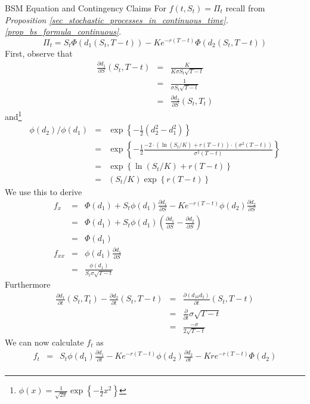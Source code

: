 \documentclass[11pt,a4paper]{article}
\begin{document}
  \begin{example}{BSM Equation and Contingency Claims}\label{ex_bsm_equation_and_contingency_claims}
    For $f(t,S_t)=\Pi_t$ recall from \textit{Proposition \ref{sec_stochastic_processes_in_continuous_time}.\ref{prop_bs_formula_continuous}}.
    \[ \Pi_t=S_t\Phi\left(d_1(S_t,T-t)\right)-Ke^{-r(T-t)}\Phi\left(d_2(S_t,T-t)\right) \]
    First, observe that
    \[\begin{array}{rcl}
      \frac{\partial d_1}{\partial S}(S_t,T-t)&=&\frac{K}{K\sigma S_t\sqrt{T-t}}\\
      &=&\frac1{\sigma S_t\sqrt{T-t}}\\
      &=&\frac{\partial d_2}{\partial S}(S_t,T_t)
    \end{array}\]
    and\footnote{$\phi(x)=\frac1{\sqrt{2\pi}}\exp\left\{-\frac12x^2\right\}$}
    \[\begin{array}{rcl}
      \phi(d_2)/\phi(d_1)&=&\exp\left\{-\frac12(d_2^2-d_1^2)\right\}\\
      &=&\exp\left\{-\frac12\frac{−2\cdot(\ln(S_t/K) + r(T − t))\cdot(\sigma^2(T − t))}{\sigma^2(T-t)}\right\}\\
      &=&\exp\left\{\ln(S_t/K)+r(T-t)\right\}\\
      &=&(S_t/K)\exp\left\{r(T-t)\right\}
    \end{array}\]
    We use this to derive
    \[\begin{array}{rcl}
      f_x&=&\Phi(d_1)+S_t\phi(d_1)\frac{\partial d_1}{\partial S}-Ke^{-r(T-t)}\phi(d_2)\frac{\partial d_2}{\partial S}\\
      &=&\Phi(d_1)+S_t\phi(d_1)\left(\frac{\partial d_1}{\partial S}-\frac{\partial d_2}{\partial S}\right)\\
      &=&\Phi(d_1)\\
      f_{xx}&=&\phi(d_1)\frac{\partial d_1}{\partial S}\\
      &=&\frac{\phi(d_1)}{S_t\sigma\sqrt{T-t}}
    \end{array}\]
    Furthermore
    \[\begin{array}{rcl}
      \frac{\partial d_1}{\partial t}(S_t,T_t)-\frac{\partial d_2}{\partial t}(S_t,T-t)&=&\frac{\partial (d_10d_2)}{\partial t}(S_t,T-t)\\
      &=&\frac{\partial }{\partial t}\sigma\sqrt{T-t}\\
      &=&\frac{-\sigma}{2\sqrt{T-t}}
    \end{array}\]
    We can now calculate $f_t$ as
    \[\begin{array}{rcl}
      f_t&=&S_t\phi(d_1)\frac{\partial d_1}{\partial t}-Ke^{-r(T-t)}\phi(d_2)\frac{\partial d_2}{\partial t}-Kre^{-r(T-t)}\Phi(d_2)\\

\end{array}\]
\end{example}
\end{document}
